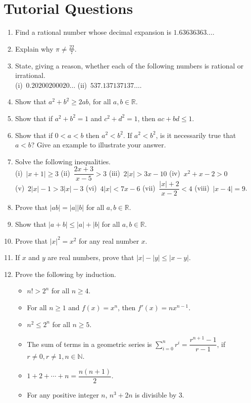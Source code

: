 \documentclass[titlepage,a4paper,12pt]{report}
\begin{document}
\section{Tutorial Questions}
\begin{enumerate}
\item Find a rational number whose decimal expansion is $1.63636363\dots$.
\item Explain why $\pi \neq \frac{22}{7}$.
\item State, giving a reason, whether each of the following numbers is rational or irrational.\\
(i)\, $0.20200200020\dots$ \quad (ii)\, $537.137137137\dots$.
\item Show that $a^2+b^2 \geq 2ab$, for all $a,b \in \mathbb{R}$.
\item Show that if $a^2+b^2=1$ and $c^2+d^2=1$, then $ac+bd \leq 1$.
\item Show that if $0<a<b$ then $a^2<b^2$. If $a^2<b^2$, is it necessarily true that $a<b$? Give an example to illustrate your answer.
\item Solve the following inequalities.\\
(i)\, $|x+1| \geq 3$ \quad (ii)\, $\dfrac{2x+3}{x-5}>3$ \quad (iii)\, $2|x|>3x-10$ \quad (iv)\, $x^2+x-2>0$ \\ (v)\, $2|x|-1>3|x|-3$ \quad (vi)\, $4|x|<7x-6$ \quad (vii)\, $\dfrac{|x|+2}{x-2}<4$ \quad (viii)\, $|x-4|=9$. 
\item Prove that $|ab|=|a||b|$ for all $a,b \in \mathbb{R}$.
\item Show that $|a+b|\leq |a|+|b|$ for all $a,b \in \mathbb{R}$.
\item Prove that $|x|^2=x^2$ for any real number $x$.
\item If $x$ and $y$ are real numbers, prove that $|x|-|y|\leq |x-y|$.
\item Prove the following by induction.
\begin{itemize}
\item[(a)] $n! >2^n$ for all $n \geq 4$.
\item[(b)] For all $n\geq 1$ and $f(x)=x^n$, then $f'(x)=nx^{n-1}$.
\item[(c)] $n^2 \leq 2^n$ for all $n \geq 5$.
\item[(d)] The sum of terms in a geometric series is $\displaystyle \sum _{i=0}^{n}{r^i}=\dfrac{r^{n+1}-1}{r-1}$, if $r \neq 0, r \neq 1, n\in \mathbb{N}$.
\item[(e)] $1+2+ \cdots +n =\dfrac{n(n+1)}{2}$.
\item[(f)] For any positive integer $n$, $n^3+2n$ is divisible by $3$.

\end{itemize}
\end{enumerate}
\end{document}
